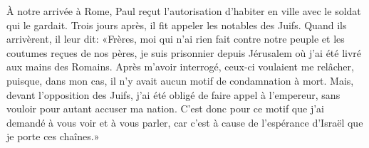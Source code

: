 À notre arrivée à Rome,
	Paul reçut l’autorisation d’habiter en ville avec le soldat qui le gardait.
Trois jours après, il fit appeler les notables des Juifs.
Quand ils arrivèrent, il leur dit:
	«Frères, moi qui n’ai rien fait contre notre peuple
		et les coutumes reçues de nos pères,
	je suis prisonnier depuis Jérusalem où j’ai été livré aux mains des Romains.
Après m’avoir interrogé, ceux-ci voulaient me relâcher,
	puisque, dans mon cas, il n’y avait aucun motif de condamnation à mort.
Mais, devant l’opposition des Juifs, j’ai été obligé de faire appel à l’empereur,
	sans vouloir pour autant accuser ma nation.
C’est donc pour ce motif que j’ai demandé à vous voir et à vous parler,
	car c’est à cause de l’espérance d’Israël que je porte ces chaînes.»

